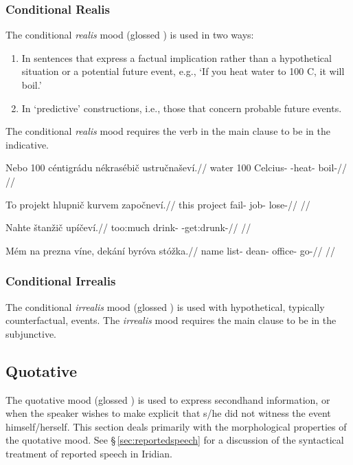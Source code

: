 \subsubsection{Conditional Realis}

\par The conditional \textit{realis} mood (glossed ) is used in two ways:
\begin{enumerate}
	\item In sentences that express a factual implication rather than a hypothetical situation or a potential future event, e.g., `If you heat water to 100 C, it will boil.'
	\item In `predictive' constructions, i.e., those that concern probable future events.
\end{enumerate}

The conditional \emph{realis} mood requires the verb in the main clause to be in the indicative.


\pex
\begingl
\gla Nebo 100 céntigrádu nékrasébič ustručnaševí.//
\glb water 100 Celcius- -heat- boil-//
\glft {}//
\endgl
\xe

\pex
\begingl
\gla To projekt hlupnič kurvem započneví.//
\glb this project fail- job- lose-//
\glft {}//
\endgl
\xe

\pex
\begingl
\gla Nahte štanžič upíčeví.//
\glb too:much drink- -get:drunk-//
\glft {}//
\endgl
\xe

\pex
\begingl
\gla Mém na prezna víne, dekání byróva stóžka.//
\glb name  list-  dean- office- go-//
\glft {}//
\endgl
\xe

\subsubsection{Conditional Irrealis}
The conditional \textit{irrealis} mood (glossed ) is used with hypothetical, typically counterfactual, events. The \emph{irrealis} mood requires the main clause to be in the subjunctive.

\subsection{Quotative}\label{sec:quotative}
\par The quotative mood (glossed ) is used to express secondhand information, or when the speaker wishes to make explicit that s/he did not witness the event himself/herself. This section deals primarily with the morphological properties of the quotative mood. See \S\,\ref{sec:reportedspeech} for a discussion of the syntactical treatment of reported speech in Iridian.

